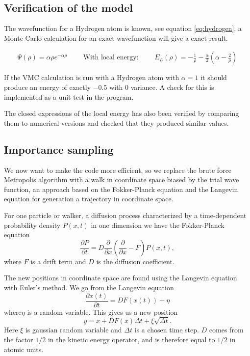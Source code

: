 \documentclass[11pt]{article}
\begin{document}
		\subsection{Verification of the model}
			The wavefunction for a Hydrogen atom is known, see equation \eqref{eq:hydrogen}, a Monte Carlo calculation for an exact wavefunction will give a exact result.

			\begin{align}
			 \Psi(\rho ) = \alpha \rho e^{-\alpha\rho} \qquad \text{ With  local energy: } \qquad E_{L} (\rho) = - \frac{1}{\rho} - \frac{\alpha}{2} \left( \alpha - \frac{2}{\rho} \right) \label{eq:hydrogen}
			\end{align}

			If the VMC calculation is run with a Hydrogen atom with \(\alpha = 1\) it should produce an energy of exactly \( -0.5\) with \(0\) variance. A check for this is implemented as a unit test in the program.

			The closed expressions of the local energy has also been verified by comparing them to numerical versions and checked that they produced similar values.


\subsection{Importance sampling}

We now want to make the code more efficient, so we replace the brute
force Metropolis algorithm with a walk in coordinate space biased
by the trial wave function, an approach based on the Fokker-Planck
equation and the Langevin equation for generation a trajectory in
coordinate space. 

For one particle or walker, a diffusion process characterized by a
time-dependent probability density $P\left(x,t\right)$ in one dimension
we have the Fokker-Planck equation
\[
\frac{\partial P}{\partial t}=D\frac{\partial}{\partial x}\left(\frac{\partial}{\partial x}-F\right)P\left(x,t\right),
\]
where $F$ is a drift term and $D$ is the diffusion coefficient. 

The new positions in coordinate space are found using the Langevin
equation with Euler's method. We go from the Langevin equation
\[
\frac{\partial x(t)}{\partial t}=DF(x(t))+\eta
\]
where$\eta$ is a random variable. This gives us a new position
\[
y=x+DF(x)\Delta t+\xi\sqrt{\Delta t}.
\]
Here $\xi$ is gaussian random variable and $\Delta t$ is a chosen
time step. $D$ comes from the factor $1/2$ in the kinetic energy
operator, and is therefore equal to $1/2$ in atomic units.
\end{document}
